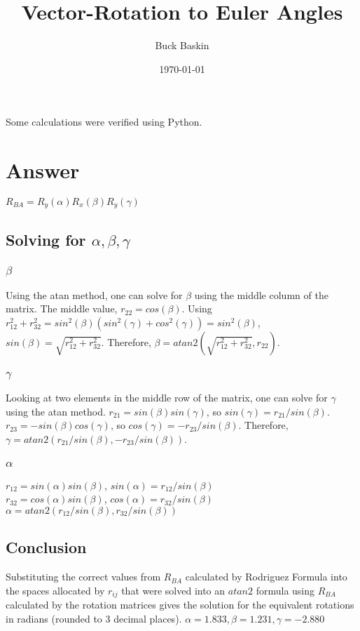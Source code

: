 \documentclass[12pt,letterpaper,oneside,notitlepage,onecolumn]{article}%
\title{Vector{-}Rotation to Euler Angles}%
\author{Buck Baskin}%
\date{\today}%
\begin{document}
%
\normalsize%
\maketitle%
Some calculations were verified using Python.%
\section{Answer}%
$R_{BA} = R_{y}(\alpha) R_{x}(\beta) R_{y}(\gamma)$%
\subsection{Solving for $\alpha, \beta, \gamma$}%
\subsubsection{$\beta$}%
Using the atan method, one can solve for $\beta$ using the middle column of the matrix. The middle value, $r_{22} = cos(\beta)$. Using $r_{12}^{2} + r_{32}^{2} = sin^{2}(\beta)(sin^{2}(\gamma) + cos^{2}(\gamma)) = sin^{2}(\beta)$, $sin(\beta) = \sqrt{r_{12}^{2} + r_{32}^{2}}$. Therefore, $\beta = atan2(\sqrt{r_{12}^{2} + r_{32}^{2}}, r_{22})$.

%
\subsubsection{$\gamma$}%
Looking at two elements in the middle row of the matrix, one can solve for $\gamma$ using the atan method. $r_{21} = sin(\beta) sin(\gamma)$, so $sin(\gamma) = r_{21} / sin(\beta)$. $r_{23} = -sin(\beta) cos(\gamma)$, so $cos(\gamma) = -r_{23} / sin(\beta)$. Therefore, $\gamma = atan2(r_{21} / sin(\beta), -r_{23} / sin(\beta))$.

%
\subsubsection{$\alpha$}%
$r_{12} = sin(\alpha) sin(\beta)$, $sin(\alpha) = r_{12} / sin(\beta)$\\$r_{32} = cos(\alpha) sin(\beta)$, $cos(\alpha) = r_{32} / sin(\beta)$\\$\alpha = atan2(r_{12} / sin(\beta), r_{32} / sin(\beta))$

%
\subsection{Conclusion}%
Substituting the correct values from $R_{BA}$ calculated by Rodriguez Formula into the spaces allocated by $r_{ij}$ that were solved into an $atan2$ formula using $R_{BA}$ calculated by the rotation matrices gives the solution for the equivalent rotations in radians (rounded to 3 decimal places).%
\newline%
$\alpha = 1.833, \beta = 1.231, \gamma = -2.880$

%
\end{document}
